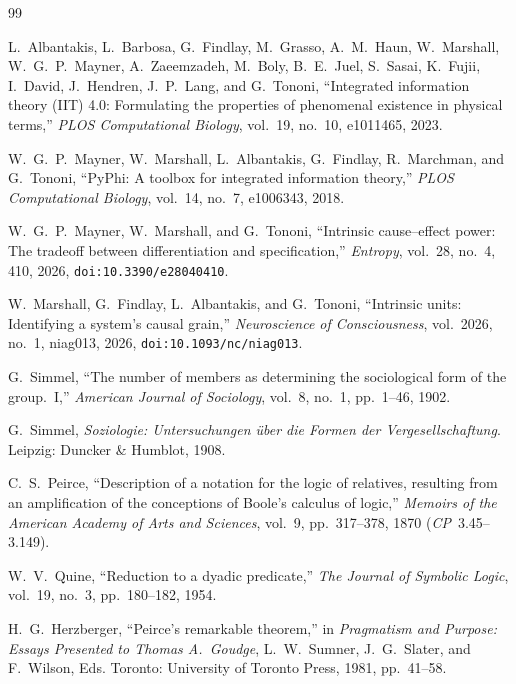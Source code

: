 \documentclass[11pt,a4paper]{article}
\begin{document}
\begin{thebibliography}{99}

L.~Albantakis, L.~Barbosa, G.~Findlay, M.~Grasso, A.~M.~Haun, W.~Marshall, W.~G.~P.~Mayner, A.~Zaeemzadeh, M.~Boly, B.~E.~Juel, S.~Sasai, K.~Fujii, I.~David, J.~Hendren, J.~P.~Lang, and G.~Tononi,
``Integrated information theory (IIT) 4.0: Formulating the properties of phenomenal existence in physical terms,''
\emph{PLOS Computational Biology}, vol.~19, no.~10, e1011465, 2023.

W.~G.~P.~Mayner, W.~Marshall, L.~Albantakis, G.~Findlay, R.~Marchman, and G.~Tononi,
``PyPhi: A toolbox for integrated information theory,''
\emph{PLOS Computational Biology}, vol.~14, no.~7, e1006343, 2018.

W.~G.~P.~Mayner, W.~Marshall, and G.~Tononi,
``Intrinsic cause--effect power: The tradeoff between differentiation and specification,''
\emph{Entropy}, vol.~28, no.~4, 410, 2026, \texttt{doi:10.3390/e28040410}.

W.~Marshall, G.~Findlay, L.~Albantakis, and G.~Tononi,
``Intrinsic units: Identifying a system's causal grain,''
\emph{Neuroscience of Consciousness}, vol.~2026, no.~1, niag013, 2026, \texttt{doi:10.1093/nc/niag013}.

G.~Simmel,
``The number of members as determining the sociological form of the group.~I,''
\emph{American Journal of Sociology}, vol.~8, no.~1, pp.~1--46, 1902.

G.~Simmel,
\emph{Soziologie: Untersuchungen \"uber die Formen der Vergesellschaftung}.
Leipzig: Duncker \& Humblot, 1908.

C.~S.~Peirce,
``Description of a notation for the logic of relatives, resulting from an amplification of the conceptions of Boole's calculus of logic,''
\emph{Memoirs of the American Academy of Arts and Sciences}, vol.~9, pp.~317--378, 1870 (\emph{CP}~3.45--3.149).

W.~V.~Quine,
``Reduction to a dyadic predicate,''
\emph{The Journal of Symbolic Logic}, vol.~19, no.~3, pp.~180--182, 1954.

H.~G.~Herzberger,
``Peirce's remarkable theorem,''
in \emph{Pragmatism and Purpose: Essays Presented to Thomas A.~Goudge}, L.~W.~Sumner, J.~G.~Slater, and F.~Wilson, Eds.
Toronto: University of Toronto Press, 1981, pp.~41--58.


\end{thebibliography}
\end{document}
